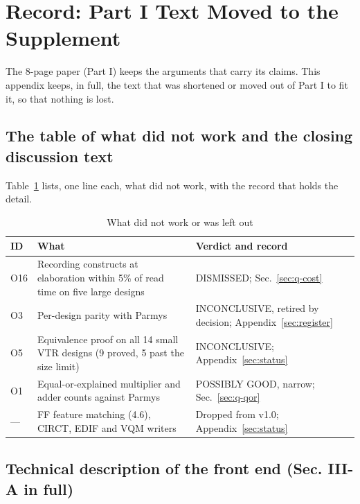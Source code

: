 \documentclass[conference]{IEEEtran}
\begin{document}
\section{Record: Part I Text Moved to the Supplement}
\label{sec:moved}

The 8-page paper (Part I) keeps the arguments that carry its claims. This appendix keeps, in full, the text that was shortened or moved out of Part I to fit it, so that nothing is lost.

\subsection{The table of what did not work and the closing discussion text}

Table~\ref{tab:didnot} lists, one line each, what did not work, with the record that holds the detail.

\begin{table}[t]
\caption{What did not work or was left out}
\label{tab:didnot}
\centering
\footnotesize
\begin{tabular}{@{}>{\raggedright\arraybackslash}p{}%
  >{\raggedright\arraybackslash}p{}>{\raggedright\arraybackslash}p{}@{}}
\toprule
ID & What & Verdict and record \\
\midrule
O16 & Recording constructs at elaboration within 5\% of read time on five large designs & DISMISSED; Sec.~\ref{sec:q-cost} \\
O3 & Per-design parity with Parmys & INCONCLUSIVE, retired by decision; Appendix~\ref{sec:register} \\
O5 & Equivalence proof on all 14 small VTR designs (9 proved, 5 past the size limit) & INCONCLUSIVE; Appendix~\ref{sec:status} \\
O1 & Equal-or-explained multiplier and adder counts against Parmys & POSSIBLY GOOD, narrow; Sec.~\ref{sec:q-qor} \\
--- & FF feature matching (4.6), CIRCT, EDIF and VQM writers & Dropped from v1.0; Appendix~\ref{sec:status} \\
\bottomrule
\end{tabular}
\end{table}

\subsection{Technical description of the front end (Sec. III-A in full)}
\end{document}
